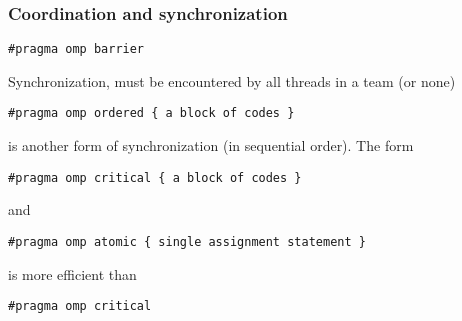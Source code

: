 \documentclass{beamer}
\begin{document}
\begin{frame}
\frametitle{Coordination and synchronization}

\begin{block}{}
\begin{verbatim}
#pragma omp barrier
\end{verbatim}
Synchronization, must be encountered by all threads in a team (or none)
\begin{verbatim}
#pragma omp ordered { a block of codes }
\end{verbatim}
is another form of synchronization (in sequential order).
The form
\begin{verbatim}
#pragma omp critical { a block of codes }
\end{verbatim}
and 
\begin{verbatim}
#pragma omp atomic { single assignment statement }
\end{verbatim}
is  more efficient than 
\begin{verbatim}
#pragma omp critical
\end{verbatim}


\end{block}
\end{frame}
\end{document}
